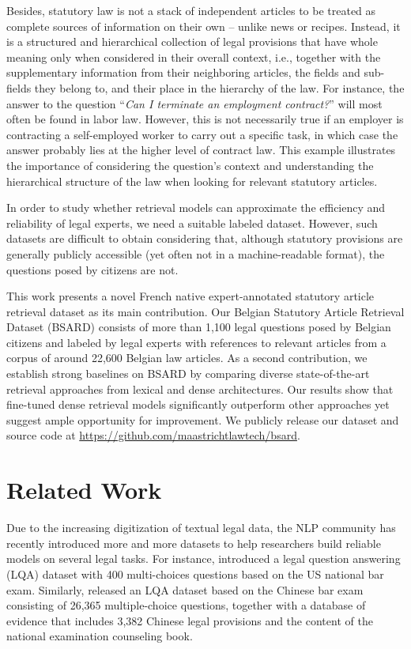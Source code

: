\documentclass[11pt]{article}
\begin{document}
Besides, statutory law is not a stack of independent articles to be treated as complete sources of information on their own -- unlike news or recipes. Instead, it is a structured and hierarchical collection of legal provisions that have whole meaning only when considered in their overall context, i.e., together with the supplementary information from their neighboring articles, the fields and sub-fields they belong to, and their place in the hierarchy of the law. For instance, the answer to the question “\textsl{Can I terminate an employment contract?}” will most often be found in labor law. However, this is not necessarily true if an employer is contracting a self-employed worker to carry out a specific task, in which case the answer probably lies at the higher level of contract law. This example illustrates the importance of considering the question’s context and understanding the hierarchical structure of the law when looking for relevant statutory articles.

In order to study whether retrieval models can approximate the efficiency and reliability of legal experts, we need a suitable labeled dataset. However, such datasets are difficult to obtain considering that, although statutory provisions are generally publicly accessible (yet often not in a machine-readable format), the questions posed by citizens are not. 

This work presents a novel French native expert-annotated statutory article retrieval dataset as its main contribution. Our Belgian Statutory Article Retrieval Dataset (BSARD) consists of more than 1,100 legal questions posed by Belgian citizens and labeled by legal experts with references to relevant articles from a corpus of around 22,600 Belgian law articles. As a second contribution, we establish strong baselines on BSARD by comparing diverse state-of-the-art retrieval approaches from lexical and dense architectures. Our results show that fine-tuned dense retrieval models significantly outperform other approaches yet suggest ample opportunity for improvement. We publicly release our dataset and source code at {\footnotesize \url{https://github.com/maastrichtlawtech/bsard}}.


\section{Related Work \label{sec:related-work}}
Due to the increasing digitization of textual legal data, the NLP community has recently introduced more and more datasets to help researchers build reliable models on several legal tasks. For instance, \citet{fawei2016passing} introduced a legal question answering (LQA) dataset with 400 multi-choices questions based on the US national bar exam. Similarly, \citet{zhong2020jec} released an LQA dataset based on the Chinese bar exam consisting of 26,365 multiple-choice questions, together with a database of evidence that includes 3,382 Chinese legal provisions and the content of the national examination counseling book. 
\end{document}
